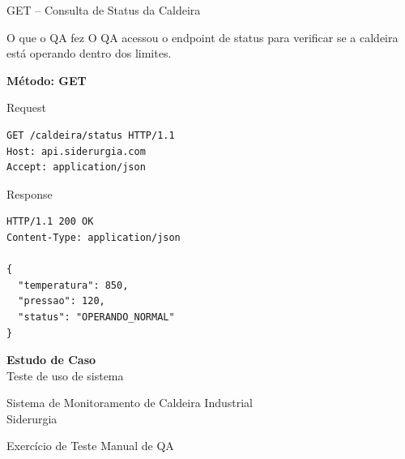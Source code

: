 \documentclass[9pt]{beamer}
\begin{document}
\begin{frame}[fragile]{GET – Consulta de Status da Caldeira}

\begin{block}{O que o QA fez}
O QA acessou o endpoint de status para verificar se a caldeira
está operando dentro dos limites.
\end{block}

\textbf{Método: GET}

\begin{block}{Request}
\begin{verbatim}
GET /caldeira/status HTTP/1.1
Host: api.siderurgia.com
Accept: application/json
\end{verbatim}
\end{block}

\begin{block}{Response}
\begin{verbatim}
HTTP/1.1 200 OK
Content-Type: application/json

{
  "temperatura": 850,
  "pressao": 120,
  "status": "OPERANDO_NORMAL"
}
\end{verbatim}
\end{block}

\end{frame}  
\begin{frame}
\centering
\vspace{1cm}

{\Huge \textbf{Estudo de Caso}} \\[0.5cm]
{\Large Teste de uso de sistema}

\vspace{1cm}

Sistema de Monitoramento de Caldeira Industrial \\
Siderurgia

\vfill
\small Exercício de Teste Manual de QA
\end{frame}
\end{document}
